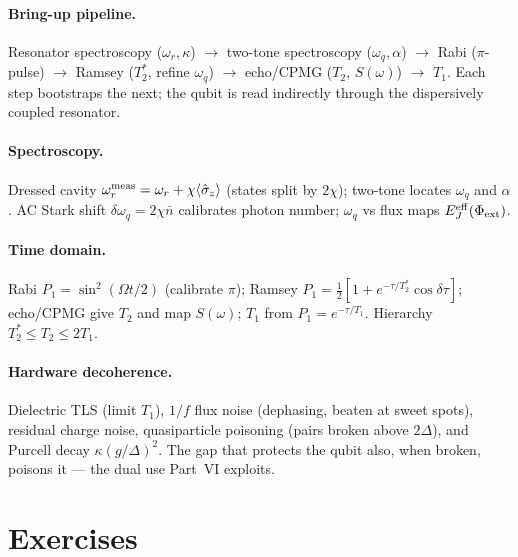 \clearpage
\begin{chaptersummary}

\paragraph{Bring-up pipeline.}
Resonator spectroscopy ($\omega_r,\kappa$) $\to$ two-tone spectroscopy
($\omega_q,\alpha$) $\to$ Rabi ($\pi$-pulse) $\to$ Ramsey
($T_2^*$, refine $\omega_q$) $\to$ echo/CPMG ($T_2$, $S(\omega)$) $\to$
$T_1$. Each step bootstraps the next; the qubit is read indirectly
through the dispersively coupled resonator.

\paragraph{Spectroscopy.}
Dressed cavity $\omega_r^{\rm meas}=\omega_r+\chi\langle\hat\sigma_z\rangle$
(states split by $2\chi$); two-tone locates $\omega_q$ and $\alpha$. AC
Stark shift $\delta\omega_q=2\chi\bar n$ calibrates photon number;
$\omega_q$ vs flux maps $E_J^{\rm eff}(\Phi_{\rm ext})$.

\paragraph{Time domain.}
Rabi $P_1=\sin^2(\Omega t/2)$ (calibrate $\pi$); Ramsey
$P_1=\tfrac12[1+e^{-\tau/T_2^*}\cos\delta\tau]$; echo/CPMG give $T_2$ and
map $S(\omega)$; $T_1$ from $P_1=e^{-\tau/T_1}$. Hierarchy
$T_2^*\le T_2\le2T_1$.

\paragraph{Hardware decoherence.}
Dielectric TLS (limit $T_1$), $1/f$ flux noise (dephasing, beaten at
sweet spots), residual charge noise, quasiparticle poisoning (pairs
broken above $2\Delta$), and Purcell decay $\kappa(g/\Delta)^2$. The
gap that protects the qubit also, when broken, poisons it --- the dual
use Part~VI exploits.

\end{chaptersummary}

\section*{Exercises}

